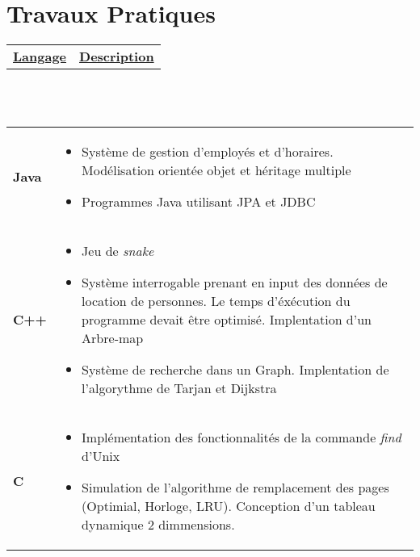 \documentclass[a4paper,10pt]{extarticle}
\begin{document}
\section{Travaux Pratiques}
\begin{tabular*}{\textwidth}{p{ }
						 	 p{ }} 
\centering\textbf{\underline{Langage}} &\centering\textbf{\underline{Description}}
\end{tabular*}
\\\\
\begin{tabular*}{\linewidth}{p{ }
						 	 p{ }} 
						 	 
\textbf{Java} &  \vspace{-0.5em}
\begin{itemize}

\item Système de gestion d'employés et d'horaires. Modélisation orientée objet et héritage multiple
\item Programmes Java utilisant  JPA et JDBC 
\end{itemize}
\\
\textbf{C++} & \vspace{-0.5em}

\begin{itemize}
\item Jeu de \emph{snake}
\item Système interrogable prenant en input des données de location de personnes. Le temps d'éxécution du programme devait être optimisé. Implentation d'un Arbre-map
\item Système de recherche dans un Graph. Implentation de l'algorythme de Tarjan et Dijkstra
\end{itemize}
\\
\textbf{C} & \vspace{-0.5em}

\begin{itemize}
\item Implémentation des fonctionnalités de la commande \emph{find} d'Unix
\item Simulation de l'algorithme de remplacement des pages (Optimial, Horloge, LRU). Conception d'un tableau dynamique 2 dimmensions.
\end{itemize}


\end{tabular*}
\end{document}
